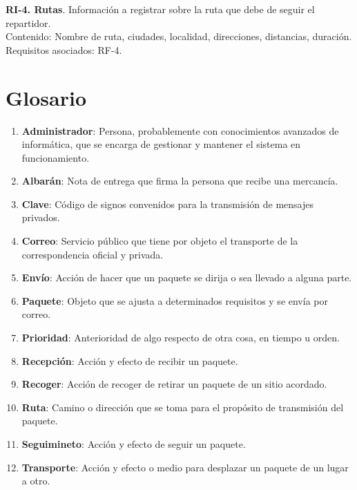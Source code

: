 \documentclass[a4paper, 11pt]{article}
\begin{document}
\textbf{RI-4. Rutas}. Informaci\'on a registrar sobre la ruta que debe de seguir el repartidor.\\
Contenido: Nombre de ruta, ciudades, localidad, direcciones, distancias, duraci\'on.\\
Requisitos asociados: RF-4.

\section{Glosario}

\begin{enumerate}
\item \textbf{Administrador}: Persona, probablemente con conocimientos avanzados de inform\'atica, que se encarga de gestionar y mantener el sistema en funcionamiento.
\item \textbf{Albar\'an}: Nota de entrega que firma la persona que recibe una mercanc\'ia.
\item \textbf{Clave}: C\'odigo de signos convenidos para la transmisi\'on de mensajes privados.
\item \textbf{Correo}: Servicio p\'ublico que tiene por objeto el transporte de la correspondencia oficial y privada.
\item \textbf{Env\'io}: Acci\'on de hacer que un paquete se dirija o sea llevado a alguna parte.
\item \textbf{Paquete}: Objeto que se ajusta a determinados requisitos y se envía por correo.
\item \textbf{Prioridad}: Anterioridad de algo respecto de otra cosa, en tiempo u orden.
\item \textbf{Recepci\'on}: Acci\'on y efecto de recibir un paquete.
\item \textbf{Recoger}: Acci\'on de recoger de retirar un paquete de un sitio acordado.
\item \textbf{Ruta}: Camino o direcci\'on que se toma para el prop\'osito de transmisi\'on del paquete.
\item \textbf{Seguimineto}: Acci\'on y efecto de seguir un paquete.
\item \textbf{Transporte}: Acci\'on y efecto o medio para desplazar un paquete de un lugar a otro.

\end{enumerate}
\end{document}
